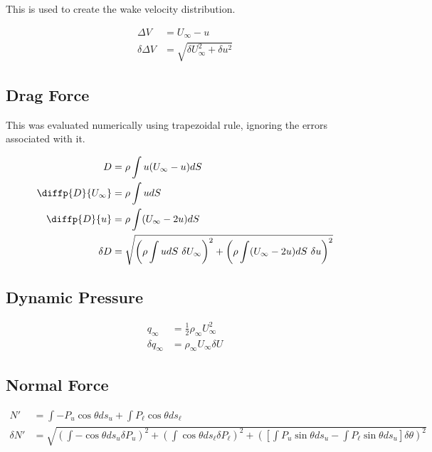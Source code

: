 \documentclass[runningheads]{llncs}
\begin{document}
This is used to create the wake velocity distribution.

\begin{align*}
    \Delta V &= U_\infty - u\\
    \delta \Delta V &= \sqrt{\delta U_\infty^2 + \delta u^2}
\end{align*}

\subsection{Drag Force}

This was evaluated numerically using trapezoidal rule, ignoring the errors associated with it.

\begin{align*}
    D &= \rho\int u (U_\infty - u) dS\\
    \diffp{D}{{U_\infty}} &= \rho \int  u dS\\
    \diffp{D}{u} &= \rho \int (U_\infty - 2u) dS\\
    \delta D &= \sqrt{\left(\rho \int  u dS \ \delta U_\infty \right)^2 + \left(\rho \int (U_\infty - 2u) dS \ \delta u \right)^2}
\end{align*}

\subsection{Dynamic Pressure}

\begin{align*}
    q_\infty &= \frac{1}{2} \rho_\infty U_\infty^2\\
    \delta q_\infty &= \rho_\infty U_\infty \delta U
\end{align*}

\subsection{Normal Force}


\begin{align*}
    N' &= \int-P_u\cos\theta ds_u + \int P_\ell\cos\theta ds_\ell \\
    \delta N' &= \sqrt{\left(\int-\cos\theta ds_u\delta P_u\right)^2 + \left(\int\cos\theta ds_\ell\delta P_\ell\right)^2 + \left(\left[\int P_u\sin\theta ds_u - \int P_\ell\sin\theta ds_u\right]\delta\theta\right)^2}
\end{align*}
\end{document}
